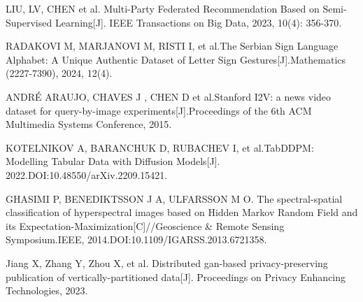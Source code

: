 \begin{thebibliography}{200}
	LIU, LV, CHEN et al. Multi-Party Federated Recommendation Based on Semi-Supervised Learning[J]. IEEE Transactions on Big Data, 2023, 10(4): 356-370.

	RADAKOVI M, MARJANOVI M, RISTI I, et al.The Serbian Sign Language Alphabet: A Unique Authentic Dataset of Letter Sign Gestures[J].Mathematics (2227-7390), 2024, 12(4).

	ANDRÉ ARAUJO, CHAVES J , CHEN D et al.Stanford I2V: a news video dataset for query-by-image experiments[J].Proceedings of the 6th ACM Multimedia Systems Conference, 2015.
	
	KOTELNIKOV A, BARANCHUK D, RUBACHEV I, et al.TabDDPM: Modelling Tabular Data with Diffusion Models[J].  2022.DOI:10.48550/arXiv.2209.15421.
	
	GHASIMI P, BENEDIKTSSON J A, ULFARSSON M O. The spectral-spatial classification of hyperspectral images based on Hidden Markov Random Field and its Expectation-Maximization[C]//Geoscience \& Remote Sensing Symposium.IEEE, 2014.DOI:10.1109/IGARSS.2013.6721358.
	
	Jiang X, Zhang Y, Zhou X, et al. Distributed gan-based privacy-preserving publication of vertically-partitioned data[J]. Proceedings on Privacy Enhancing Technologies, 2023.







\end{thebibliography}
